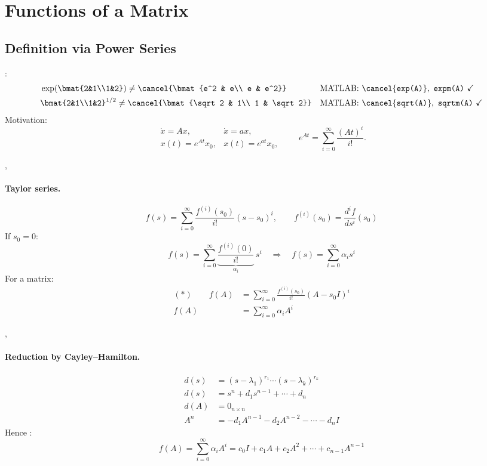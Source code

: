 \section{Functions of a Matrix}\label{sec:functions}
\subsection{Definition via Power Series}\label{ss:fn-def}
:
\begin{align*}
&\exp\!\left(\bmat{2&1\\1&2}\right) \neq \cancel{\bmat{e^2 & e\\ e & e^2}}
&& \text{MATLAB: } \cancel{\texttt{exp(A)}},\ \texttt{expm(A)}\ \checkmark\\
&\bmat{2&1\\1&2}^{1/2} \neq \cancel{\bmat{\sqrt2 & 1\\ 1 & \sqrt2}}
&& \text{MATLAB: } \cancel{\texttt{sqrt(A)}},\ \texttt{sqrtm(A)}\ \checkmark
\end{align*}
Motivation:
\[
\begin{array}{ll}
\dot{x} = Ax, & \dot{x} = ax,\\
x(t) = e^{At}x_0, & x(t) = e^{at}x_0,
\end{array}
\qquad
e^{At} = \sum_{i=0}^{\infty}\frac{(At)^i}{i!}.
\]

\sep
\paragraph{Taylor series.}
\[
f(s) = \sum_{i=0}^{\infty}\frac{f^{(i)}(s_0)}{i!}(s-s_0)^i,
\qquad
f^{(i)}(s_0) = \frac{d^i f}{ds^i}(s_0)
\]
If $s_0=0$:
\[
f(s) = \sum_{i=0}^{\infty}\underbrace{\frac{f^{(i)}(0)}{i!}}_{\alpha_i}\, s^i
\quad\Longrightarrow\quad
f(s) = \sum_{i=0}^{\infty}\alpha_i s^i
\]
For a matrix:
\begin{align*}
(\ast)\qquad f(A) &= \sum_{i=0}^{\infty}\frac{f^{(i)}(s_0)}{i!}(A-s_0I)^i\\
f(A) &= \sum_{i=0}^{\infty}\alpha_i A^i
\end{align*}

\sep
\paragraph{Reduction by Cayley--Hamilton.}
\begin{align*}
d(s) &= (s-\lambda_1)^{r_1}\cdots(s-\lambda_k)^{r_k}\\
d(s) &= s^n + d_1 s^{n-1} + \cdots + d_n\\
d(A) &= 0_{n\times n}\\
A^n &= -d_1A^{n-1} - d_2A^{n-2} - \cdots - d_nI
\end{align*}
Hence :
\[
f(A) = \sum_{i=0}^{\infty}\alpha_i A^i = c_0I + c_1A + c_2A^2 + \cdots + c_{n-1}A^{n-1}
\]

